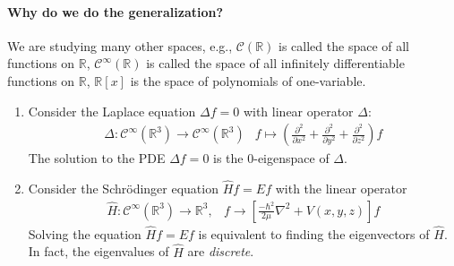 \paragraph{Why do we do the generalization?}
We are studying many other spaces, e.g., $\mathcal{C}(\mathbb{R})$ is called the space of all functions on $\mathbb{R}$, $\mathcal{C}^\infty(\mathbb{R})$ is called the space of all infinitely differentiable functions on $\mathbb{R}$, $\mathbb{R}[x]$ is the space of polynomials of one-variable.
\begin{example}
\begin{enumerate}
\item
Consider the Laplace equation $\Delta f=0$ with linear operator $\Delta$:
\[
\begin{array}{ll}
\Delta:\mathcal{C}^\infty(\mathbb{R}^3)\to\mathcal{C}^\infty(\mathbb{R}^3)
&
f\mapsto(\frac{\partial^2}{\partial x^2}+\frac{\partial^2}{\partial y^2}+\frac{\partial^2}{\partial z^2})f
\end{array}
\]
The solution to the PDE $\Delta f=0$ is the 0-eigenspace of $\Delta$.
\item
Consider the Schrödinger equation
$
\hat Hf = Ef
$
with the linear operator 
\[
\begin{array}{ll}
\hat H:\mathcal{C}^\infty(\mathbb{R}^3)\to\mathbb{R}^3,
&
f\to
\left[{\frac
 {-\hbar ^{2}}{2\mu }}\nabla ^{2}+V(x,y,z )\right]f
\end{array}
\]
Solving the equation $\hat Hf=Ef$ is equivalent to finding the eigenvectors of $\hat H$. In fact, the eigenvalues of $\hat H$ are \emph{discrete}.
\end{enumerate}
\end{example}

